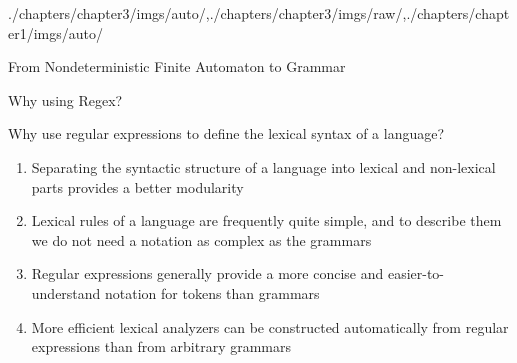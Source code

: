 \begin{graphicspathcontext}{{./chapters/chapter3/imgs/auto/},{./chapters/chapter3/imgs/raw/},{./chapters/chapter1/imgs/auto/}}
\begin{bibunit}[apalike]
\begin{frame}[t]{From Nondeterministic Finite Automaton to Grammar}
	\begin{footnotesize}
	\begin{myalgorithm}
	\end{myalgorithm}
	\end{footnotesize}
\end{frame}

\begin{frame}[t]{Why using Regex?}
	\begin{alertblock}{Why use regular expressions to define the lexical syntax of a language?}
		\begin{enumerate}
			\item Separating the syntactic structure of a language into lexical and non-lexical parts provides a better modularity
			\item Lexical rules of a language are frequently quite simple, and to describe them we do not need a notation as complex as the grammars
			\item Regular expressions generally provide a more concise and easier-to-understand notation for tokens than grammars
			\item More efficient lexical analyzers can be constructed automatically from regular expressions than from arbitrary grammars
		\end{enumerate}
	\end{alertblock}
	\hfill
\end{frame}


\end{bibunit}
\end{graphicspathcontext}
